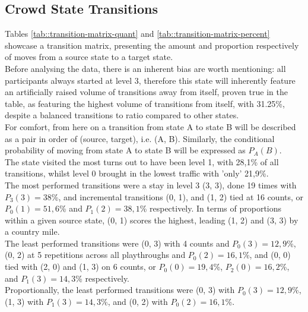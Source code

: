 \subsection{Crowd State Transitions}

Tables \ref{tab::transition-matrix-quant} and \ref{tab::transition-matrix-percent} showcase a transition matrix, presenting the amount and proportion respectively of moves from a source state to a target state.\\
Before analysing the data, there is an inherent bias are worth mentioning: all participants always started at level 3, therefore this state will inherently feature an artificially raised volume of transitions away from itself, proven true in the table, as featuring the highest volume of transitions from itself, with 31.25\%, despite a balanced transitions to ratio compared to other states.\\

For comfort, from here on a transition from state A to state B will be described as a pair in order of (source, target), i.e. (A, B). Similarly, the conditional probability of moving from state A to state B will be expressed as $P_A(B)$.\\

The state visited the most turns out to have been level 1, with 28,1\% of all transitions, whilst level 0 brought in the lowest traffic with 'only' 21,9\%.\\
The most performed transitions were a stay in level 3 (3, 3), done 19 times with $P_3(3) = 38$\%, and incremental transitions (0, 1), and (1, 2) tied at 16 counts, or $P_0(1) = 51,6$\% and $P_1(2) = 38,1$\% respectively. In terms of proportions within a given source state, (0, 1) scores the highest, leading (1, 2) and (3, 3) by a country mile.\\
The least performed transitions were (0, 3) with 4 counts and $P_0(3) = 12,9$\%, (0, 2) at 5 repetitions across all playthroughs and $P_0(2) = 16,1$\%, and (0, 0) tied with (2, 0) and (1, 3) on 6 counts, or $P_0(0) = 19,4$\%, $P_2(0) = 16,2$\%, and $P_1(3) = 14,3$\% respectively.\\
Proportionally, the least performed transitions were (0, 3) with $P_0(3) = 12,9$\%, (1, 3) with $P_1(3) = 14,3$\%, and (0, 2) with $P_0(2) = 16,1$\%.



